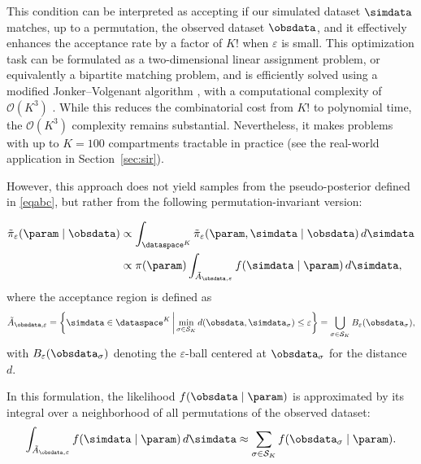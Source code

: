 This condition can be interpreted as accepting if our simulated dataset $\simdata$ matches, up to a permutation, the observed dataset $\obsdata$, and it effectively enhances the acceptance rate by a factor of $K!$ when $\varepsilon$ is small. This optimization task can be formulated as a two-dimensional linear assignment problem, or equivalently a bipartite matching problem, and is efficiently solved using a modified Jonker–Volgenant algorithm \citep{jonker1987shortest}, with a computational complexity of $\mathcal{O}(K^3)$ \citep{crouseImplementing2DRectangular2016a}.
While this reduces the combinatorial cost from $K!$ to polynomial time, the $\mathcal{O}(K^3)$ complexity remains substantial. Nevertheless, it makes problems with up to $K = 100$ compartments tractable in practice (see the real-world application in Section~\ref{sec:sir}).


However, this approach does not yield samples from the pseudo-posterior defined in \eqref{eqabc}, but rather from the following permutation-invariant version:

\begin{equation} 
    \label{eqpermabc_tilde}
    \begin{split}
        \Tilde \pi_{\varepsilon} (\param \mid \obsdata)  & \propto \int_{\dataspace^K} \Tilde \pi_{\varepsilon} (\param , \simdata \mid \obsdata) \, d\simdata \\
        & \propto \pi(\param) \int_{\Tilde A_{\obsdata,\varepsilon}} f(\simdata \mid \param) \, d\simdata,
    \end{split}
\end{equation}
where the acceptance region is defined as
\[
\tilde{A}_{\obsdata,\varepsilon} = \left\{\simdata \in \dataspace^K \,\middle|\, \min_{\sigma \in \mathcal{S}_K} d(\obsdata, \simdata_{\sigma}) \leq \varepsilon \right\} = \bigcup_{\sigma \in \mathcal{S}_K} B_{\varepsilon}(\obsdata_{\sigma}),
\]
with \( B_{\varepsilon}(\obsdata_{\sigma}) \) denoting the \( \varepsilon \)-ball centered at \( \obsdata_{\sigma} \) for the distance \( d \).

In this formulation, the likelihood \( f(\obsdata \mid \param) \) is approximated by its integral over a neighborhood of all permutations of the observed dataset:
\[
\int_{\tilde{A}_{\obsdata,\varepsilon}} f(\simdata \mid \param) \, d\simdata \approx \sum_{\sigma \in \mathcal{S}_K} f(\obsdata_{\sigma} \mid \param).
\]

